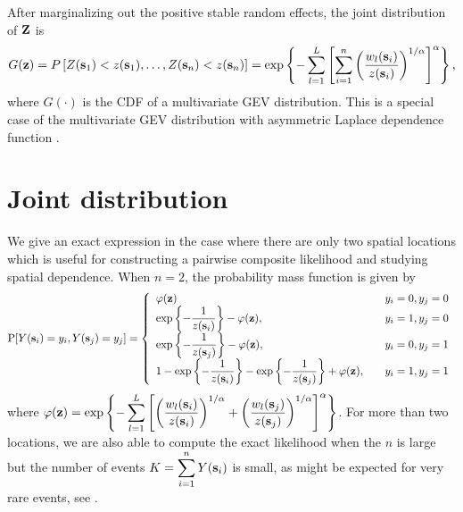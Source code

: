 \documentclass[11pt]{article}
\begin{document}
After marginalizing out the positive stable random effects, the joint distribution of $\mbox{\bf Z}$ is
\begin{align}\label{rbeq:jointCDF}
  G(\mbox{\bf z}) = P\left[Z(\mbox{\bf s}_1) < z(\mbox{\bf s}_1), \ldots, Z(\mbox{\bf s}_n) < z(\mbox{\bf s}_n)\right] = \exp\left\{-\sum_{l=1}^L\left[\sum_{i=1}^n\left(\frac{w_{l}(\mbox{\bf s}_i)}{z(\mbox{\bf s}_i)}\right)^{1/\alpha}\right]^{\alpha}\right\},
\end{align}
where $G(\cdot)$ is the CDF of a multivariate GEV distribution.
This is a special case of the multivariate GEV distribution with asymmetric Laplace dependence function \citep{Tawn1990}.



\section{Joint distribution}\label{rbs:multivariate}
We give an exact expression in the case where there are only two spatial locations which is useful for constructing a pairwise composite likelihood \citep{Padoan2010} and studying spatial dependence.
When $n = 2$, the probability mass function is given by
\begin{align} \label{rbeq:biv}
  \text{P}[Y(\mbox{\bf s}_i) = y_i, Y(\mbox{\bf s}_j) = y_j] = \left\{ \begin{array}{ll}
    \varphi(\mbox{\bf z}) &y_i = 0, y_j = 0\\
    \exp\left\{ - \displaystyle \frac{ 1 }{ z(\mbox{\bf s}_i) } \right\} - \varphi(\mbox{\bf z}), &y_i = 1, y_j = 0 \\
    \exp\left\{ - \displaystyle \frac{ 1 }{ z(\mbox{\bf s}_j) } \right\} - \varphi(\mbox{\bf z}), &y_i = 0, y_j = 1 \\
    1 - \exp\left\{ - \displaystyle\frac{ 1 }{ z(\mbox{\bf s}_i) } \right\} - \exp \left\{ -\displaystyle \frac{ 1 }{z(\mbox{\bf s}_j)} \right\} + \varphi(\mbox{\bf z}), \quad &y_i = 1, y_j = 1
  \end{array} \right.
\end{align}
where $\varphi(\mbox{\bf z}) = \exp \left\{ - \displaystyle \sum_{ l = 1 }^{ L } \left[ \left( \displaystyle \frac{ w_{ l }(\mbox{\bf s}_i) }{ z(\mbox{\bf s}_i) } \right)^{1/\alpha} + \left( \displaystyle \frac{ w_{l }(\mbox{\bf s}_j)}{z(\mbox{\bf s}_j)} \right)^{1/\alpha} \right]^{\alpha} \right\}$.
For more than two locations, we are also able to compute the exact likelihood when the $n$ is large but the number of events $K = \displaystyle \sum_{i = 1}^n Y(\mbox{\bf s}_i)$ is small, as might be expected for very rare events, see .
\end{document}
